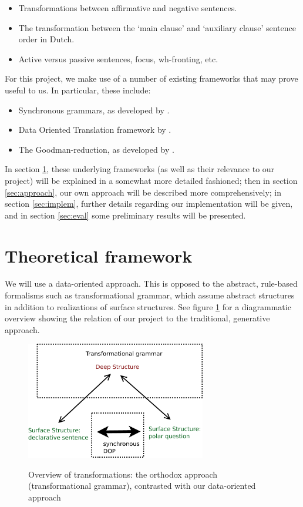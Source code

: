 \documentclass[a4paper]{article}
\theoremstyle{definition}
\begin{document}
\begin{itemize}
\item Transformations between affirmative and negative sentences.
\item The transformation between the `main clause' and `auxiliary clause'
	sentence order in Dutch.
\item Active versus passive sentences, focus, wh-fronting, etc.
\end{itemize}

For this project, we make use of a number of existing frameworks that may prove
useful to us. In particular, these include:

\begin{itemize}
\item Synchronous grammars, as developed by \citet{chiang2006introduction}.
\item Data Oriented Translation framework by \citet{poutsma2000msc, poutsma2000coling}.
\item The Goodman-reduction, as developed by \citet{goodman2003efficient}.
\end{itemize}

In section \ref{sec:theor}, these underlying frameworks (as well as their
relevance to our project) will be explained in a somewhat more detailed
fashioned; then in section \ref{sec:approach}, our own approach will be
described more comprehensively; in section \ref{sec:implem}, further details
regarding our implementation will be given, and in section \ref{sec:eval} some preliminary
results will be presented.

\section{Theoretical framework}
\label{sec:theor}

We will use a data-oriented approach. This is opposed to the abstract, rule-based
formalisms such as transformational grammar, which assume abstract structures in
addition to realizations of surface structures. See figure \ref{synchdop} for a diagrammatic overview
showing the relation of our project to the traditional, generative approach.

\begin{figure}
\centering\includegraphics[width=0.7\textwidth]{synchdop-crop}
\label{synchdop}
\caption{Overview of transformations: the orthodox approach (transformational grammar),
	contrasted with our data-oriented approach}
\end{figure}
\end{document}
